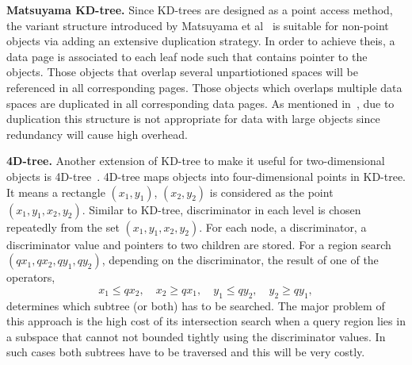 \documentclass[a4paper,12pt]{article}
\begin{document}
\textbf{Matsuyama KD-tree.} Since KD-trees are designed as a point access method, the variant structure introduced by Matsuyama et al~\cite{matsuyama} is suitable for non-point objects via adding an extensive duplication strategy. In order to achieve theis, a data page is associated to each leaf node such that contains pointer to the objects. Those objects that overlap several unpartiotioned spaces will be referenced in all corresponding pages. Those objects which overlaps multiple data spaces are duplicated in all corresponding data pages. As mentioned in~\cite{survey}, due to duplication this structure is not appropriate for data with large objects since redundancy will cause high overhead.

\textbf{4D-tree.} Another extension of KD-tree to make it useful for two-dimensional objects is 4D-tree~\cite{4dtree}. 4D-tree maps objects into four-dimensional points in KD-tree. It means a rectangle $(x‍‍_1, y_1)$, $(x_2, y_2)$ is considered as the point $(x‍‍_1, y_1, x_2, y_2)$. Similar to KD-tree, discriminator in each level is chosen repeatedly from the set $(x‍‍_1, y_1, x_2, y_2)$. For each node, a discriminator, a discriminator value and pointers to two children are stored. 
For a region search $(qx_1, qx_2, qy_1, qy_2)$, depending on the discriminator, the result of one of the operators,
$$x_1 \leq qx_2, \quad x_2 \geq qx_1, \quad y_1 \leq qy_2, \quad y_2 \geq qy_1,$$ 
determines which subtree (or both) has to be searched.
The major problem of this approach is the high cost of its intersection search when a query region lies in a subspace that cannot not bounded tightly using the discriminator values. In such cases both subtrees have to be traversed and this will be very costly.
\end{document}
